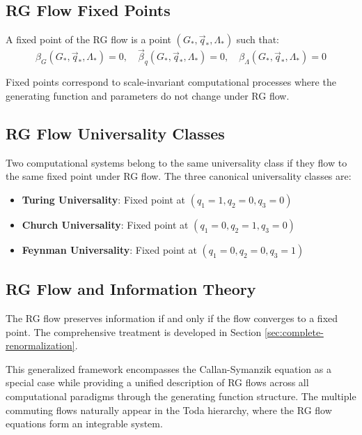 \subsection{RG Flow Fixed Points}

\begin{definition}
\label{def:rg-fixed-points-general}
A fixed point of the RG flow is a point $(G_*, \vec{q}_*, \Lambda_*)$ such that:
\[
\beta_G(G_*, \vec{q}_*, \Lambda_*) = 0, \quad \vec{\beta}_q(G_*, \vec{q}_*, \Lambda_*) = 0, \quad \beta_\Lambda(G_*, \vec{q}_*, \Lambda_*) = 0
\]

Fixed points correspond to scale-invariant computational processes where the generating function and parameters do not change under RG flow.
\end{definition}

\subsection{RG Flow Universality Classes}

\begin{definition}
\label{def:universality-classes}
Two computational systems belong to the same universality class if they flow to the same fixed point under RG flow. The three canonical universality classes are:
\begin{itemize}
\item \textbf{Turing Universality}: Fixed point at $(q_1=1, q_2=0, q_3=0)$
\item \textbf{Church Universality}: Fixed point at $(q_1=0, q_2=1, q_3=0)$
\item \textbf{Feynman Universality}: Fixed point at $(q_1=0, q_2=0, q_3=1)$
\end{itemize}
\end{definition}

\subsection{RG Flow and Information Theory}

The RG flow preserves information if and only if the flow converges to a fixed point. The comprehensive treatment is developed in Section \ref{sec:complete-renormalization}.

This generalized framework encompasses the Callan-Symanzik equation as a special case while providing a unified description of RG flows across all computational paradigms through the generating function structure. The multiple commuting flows naturally appear in the Toda hierarchy, where the RG flow equations form an integrable system.


